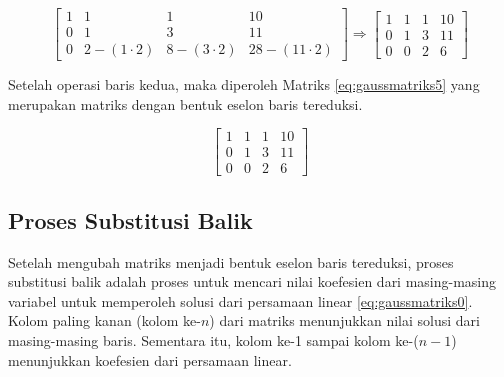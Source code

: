 \begin{center}
	\setlength\arraycolsep{10pt}
	\begin{equation}
		\begin{bmatrix}
				1 	& 1 							& 1 							& 10 		\\[1em]
				0 	& 1 							& 3 							& 11 		\\[1em]
				0 	& 2 - (1\cdot2) 	& 8 - (3\cdot2) 	& 28 - (11\cdot2)
		\end{bmatrix} \Rightarrow
		\begin{bmatrix}
				1 	& 1 	& 1 	& 10 		\\[1em]
				0 	& 1 	& 3 	& 11 		\\[1em]
				0 	& 0 	& 2 	& 6
		\end{bmatrix} \label{eq:gaussmatriks4}
	\end{equation}
\end{center}

Setelah operasi baris kedua, maka diperoleh Matriks \ref{eq:gaussmatriks5} yang merupakan matriks dengan bentuk eselon baris tereduksi.

\begin{center}
	\setlength\arraycolsep{10pt}
	\begin{equation}
		\begin{bmatrix}
				1 	& 1 	& 1 	& 10 		\\[1em]
				0 	& 1 	& 3 	& 11 		\\[1em]
				0 	& 0 	& 2 	& 6
		\end{bmatrix} \label{eq:gaussmatriks5}
	\end{equation}
\end{center}

\subsection{Proses Substitusi Balik}

Setelah mengubah matriks menjadi bentuk eselon baris tereduksi, proses substitusi balik adalah proses untuk mencari nilai koefesien dari masing-masing variabel untuk memperoleh solusi dari persamaan linear \ref{eq:gaussmatriks0}. Kolom paling kanan (kolom ke-\begin{math}n\end{math}) dari matriks menunjukkan nilai solusi dari masing-masing baris. Sementara itu, kolom ke-1 sampai kolom ke-(\begin{math}n-1\end{math}) menunjukkan koefesien dari persamaan linear.

